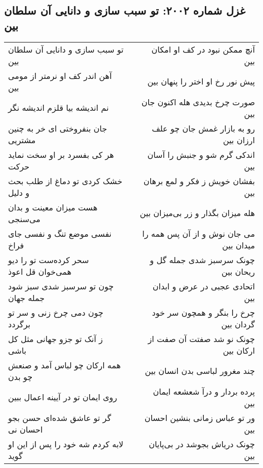 \begin{center}
\section*{غزل شماره ۲۰۰۲: تو سبب سازی و دانایی آن سلطان بین}
\label{sec:2002}
\begin{longtable}{l p{0.5cm} r}
تو سبب سازی و دانایی آن سلطان بین
&&
آنچ ممکن نبود در کف او امکان بین
\\
آهن اندر کف او نرمتر از مومی بین
&&
پیش نور رخ او اختر را پنهان بین
\\
نم اندیشه بیا قلزم اندیشه نگر
&&
صورت چرخ بدیدی هله اکنون جان بین
\\
جان بنفروختی ای خر به چنین مشتریی
&&
رو به بازار غمش جان چو علف ارزان بین
\\
هر کی بفسرد بر او سخت نماید حرکت
&&
اندکی گرم شو و جنبش را آسان بین
\\
خشک کردی تو دماغ از طلب بحث و دلیل
&&
بفشان خویش ز فکر و لمع برهان بین
\\
هست میزان معینت و بدان می‌سنجی
&&
هله میزان بگذار و زر بی‌میزان بین
\\
نفسی موضع تنگ و نفسی جای فراخ
&&
می جان نوش و از آن پس همه را میدان بین
\\
سحر کرده‌ست تو را دیو همی‌خوان قل اعوذ
&&
چونک سرسبز شدی جمله گل و ریحان بین
\\
چون تو سرسبز شدی سبز شود جمله جهان
&&
اتحادی عجبی در عرض و ابدان بین
\\
چون دمی چرخ زنی و سر تو برگردد
&&
چرخ را بنگر و همچون سر خود گردان بین
\\
ز آنک تو جزو جهانی مثل کل باشی
&&
چونک نو شد صفتت آن صفت از ارکان بین
\\
همه ارکان چو لباس آمد و صنعش چو بدن
&&
چند مغرور لباسی بدن انسان بین
\\
روی ایمان تو در آیینه اعمال ببین
&&
پرده بردار و درآ شعشعه ایمان بین
\\
گر تو عاشق شده‌ای حسن بجو احسان نی
&&
ور تو عباس زمانی بنشین احسان بین
\\
لابه کردم شه خود را پس از این او گوید
&&
چونک دریاش بجوشد در بی‌پایان بین
\\
\end{longtable}
\end{center}
